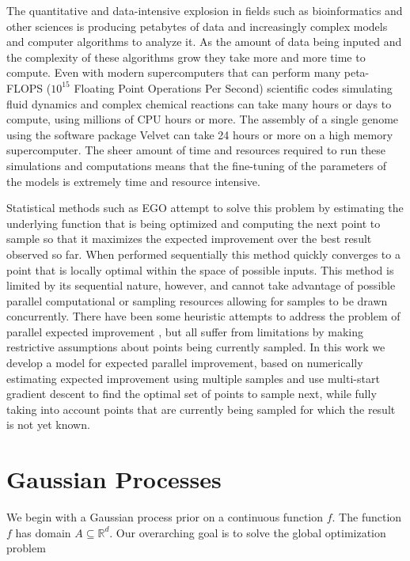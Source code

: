 \documentclass[phd,tocprelim]{cornell}
\begin{document}
The quantitative and data-intensive explosion in fields such as bioinformatics and other sciences is producing petabytes of data and increasingly complex models and computer algorithms to analyze it. As the amount of data being inputed and the complexity of these algorithms grow they take more and more time to compute. Even with modern supercomputers that can perform many peta-FLOPS ($10^{15}$ Floating Point Operations Per Second) scientific codes simulating fluid dynamics \cite{Compo2011} and complex chemical reactions \cite{Valiev2010} can take many hours or days to compute, using millions of CPU hours or more. The assembly of a single genome using the software package Velvet \cite{Zerbino2008} can take 24 hours or more on a high memory supercomputer. The sheer amount of time and resources required to run these simulations and computations means that the fine-tuning of the parameters of the models is extremely time and resource intensive.

Statistical methods such as EGO \cite{Jones1998} attempt to solve this problem by estimating the underlying function that is being optimized and computing the next point to sample so that it maximizes the expected improvement over the best result observed so far. When performed sequentially this method quickly converges to a point that is locally optimal within the space of possible inputs. This method is limited by its sequential nature, however, and cannot take advantage of possible parallel computational or sampling resources allowing for samples to be drawn concurrently. There have been some heuristic attempts to address the problem of parallel expected improvement \cite{Ginsbourger2008}, but all suffer from limitations by making restrictive assumptions about points being currently sampled. In this work we develop a model for expected parallel improvement, based on numerically estimating expected improvement using multiple samples and use multi-start gradient descent to find the optimal set of points to sample next, while fully taking into account points that are currently being sampled for which the result is not yet known.

\section{Gaussian Processes}

We begin with a Gaussian process prior on a continuous function $f$. The function $f$ has domain $A \subseteq \mathbb{R}^{d}$. Our overarching goal is to solve the global optimization problem
\end{document}
